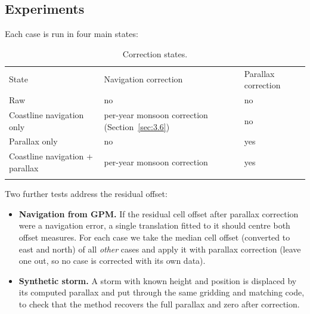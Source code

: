 \subsection{Experiments}\label{sec:4.5}

Each case is run in four main states:

\begin{table}[t]
\caption{Correction states.}\label{tab:S}
\begin{tabular}{@{}
  >{\raggedright\arraybackslash}p{}
  >{\raggedright\arraybackslash}p{}
  >{\raggedright\arraybackslash}p{}@{}}
\tophline
\begin{minipage}[b]{\linewidth}\raggedright
State
\end{minipage} & \begin{minipage}[b]{\linewidth}\raggedright
Navigation correction
\end{minipage} & \begin{minipage}[b]{\linewidth}\raggedright
Parallax correction
\end{minipage} \\
\middlehline
Raw & no & no \\
Coastline navigation only & per-year monsoon correction (Section~\ref{sec:3.6}) & no \\
Parallax only & no & yes \\
Coastline navigation + parallax & per-year monsoon correction & yes \\
\bottomhline
\end{tabular}
\end{table}

Two further tests address the residual offset:

\begin{itemize}
\tightlist
\item
  \textbf{Navigation from GPM.} If the residual cell offset after parallax correction were a navigation error, a single translation fitted to it should centre both offset measures. For each case we take the median cell offset (converted to east and north) of all \emph{other} cases and apply it with parallax correction (leave one out, so no case is corrected with its own data).
\item
  \textbf{Synthetic storm.} A storm with known height and position is displaced by its computed parallax and put through the same gridding and matching code, to check that the method recovers the full parallax and zero after correction.
\end{itemize}

